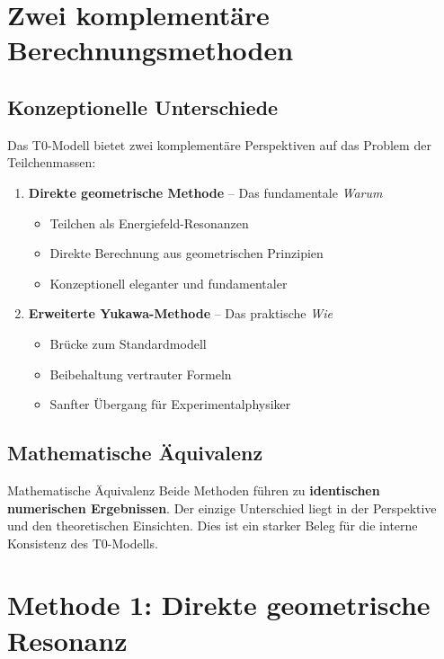 \documentclass[12pt,a4paper]{article}
\begin{document}
	\section{Zwei komplementäre Berechnungsmethoden}
	\label{sec:two_calculation_methods}
	
	\subsection{Konzeptionelle Unterschiede}
	\label{subsec:conceptual_differences}
	
	Das T0-Modell bietet zwei komplementäre Perspektiven auf das Problem der Teilchenmassen:
	
	\begin{enumerate}
		\item \textbf{Direkte geometrische Methode} -- Das fundamentale \textit{Warum}
		\begin{itemize}
			\item Teilchen als Energiefeld-Resonanzen
			\item Direkte Berechnung aus geometrischen Prinzipien
			\item Konzeptionell eleganter und fundamentaler
		\end{itemize}
		
		\item \textbf{Erweiterte Yukawa-Methode} -- Das praktische \textit{Wie}
		\begin{itemize}
			\item Brücke zum Standardmodell
			\item Beibehaltung vertrauter Formeln
			\item Sanfter Übergang für Experimentalphysiker
		\end{itemize}
	\end{enumerate}
	
	\subsection{Mathematische Äquivalenz}
	\label{subsec:mathematical_equivalence}
	
	\begin{keyresult}{Mathematische Äquivalenz}{}
		Beide Methoden führen zu \textbf{identischen numerischen Ergebnissen}. Der einzige Unterschied liegt in der Perspektive und den theoretischen Einsichten. Dies ist ein starker Beleg für die interne Konsistenz des T0-Modells.
	\end{keyresult}
	
	\section{Methode 1: Direkte geometrische Resonanz}
	\label{sec:direct_geometric_method}
	
\end{document}
